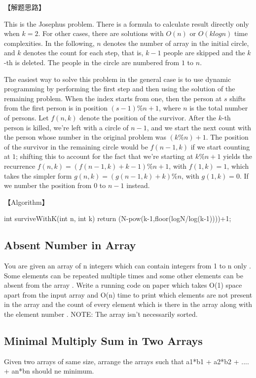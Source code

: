 【解题思路】

This is the Josephus problem. There is a formula to calculate result directly only when $k=2$. For other cases, there are solutions with $O(n)$ or $O(klogn)$ time complexities. In the following, $n$ denotes the number of array in the initial circle, and $k$ denotes the count for each step, that is, $k-1$ people are skipped and the $k$-th is deleted. The people in the circle are numbered from $1$ to $n$.

The easiest way to solve this problem in the general case is to use dynamic programming by performing the first step and then using the solution of the remaining problem. When the index starts from one, then the person at $s$ shifts from the first person is in position $(s-1)\%n+1$, where $n$ is the total number of persons. Let $f(n,k)$ denote the position of the survivor. After the $k$-th person is killed, we're left with a circle of $n-1$, and we start the next count with the person whose number in the original problem was $(k\%n)+1$. The position of the survivor in the remaining circle would be $f(n-1,k)$ if we start counting at $1$; shifting this to account for the fact that we're starting at $k\%n+1$ yields the recurrence
$f(n,k)=(f(n-1,k)+k-1)\%n+1$, with $f(1,k)=1$, which takes the simpler form $g(n,k)=(g(n-1,k)+k)\%n$, with $g(1,k)=0$. If we number the position from $0$ to $n-1$ instead.


【Algorithm】
\begin{Code}
    int surviveWithK(int n, int k){
        return (N-pow(k-1,floor(logN/log(k-1))))+1;
    }
\end{Code}

\subsection{Absent Number in Array}
You are given an array of n integers which can contain integers from 1 to n only . Some elements can be repeated multiple times and some other elements can be absent from the array . Write a running code on paper which takes O(1) space apart from the input array and O(n) time to print which elements are not present in the array and the count of every element which is there in the array along with the element number .
NOTE: The array isn't necessarily sorted.

\subsection{Minimal Multiply Sum in Two Arrays}
Given two arrays of same size, arrange the arrays such that a1*b1 + a2*b2 + .... + an*bn should ne minimum.

